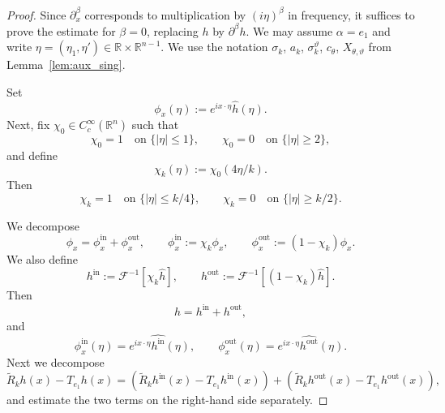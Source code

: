 \documentclass[12pt,a4paper]{amsart}
\numberwithin{equation}{section}
\theoremstyle{plain}
\theoremstyle{definition}
\begin{document}
\begin{proof}
Since $\partial_x^\beta$ corresponds to multiplication
by $(i\eta)^\beta$ in frequency, it suffices to prove the estimate
for $\beta=0$, replacing $h$ by $\partial^\beta h$.
We may assume $\alpha=e_1$ and write
$\eta=(\eta_1,\eta')\in\mathbb{R}\times\mathbb{R}^{n-1}$.
We use the notation $\sigma_k$, $a_k$, $\sigma_k^\vartheta$, $c_\theta$,
$X_{\theta,\vartheta}$ from Lemma~\ref{lem:aux_sing}.

Set
\begin{equation*}
    \phi_x(\eta):=e^{ix\cdot\eta}\widehat{h}(\eta).
\end{equation*}
Next, fix $\chi_0\in C_c^\infty(\mathbb{R}^n)$ such that
\begin{equation*}
    \chi_0=1 \quad \text{on } \{|\eta|\leq 1\},
\qquad
\chi_0=0 \quad \text{on } \{|\eta|\geq 2\},
\end{equation*}
and define
\begin{equation*}
    \chi_k(\eta):=\chi_0(4\eta/k).
\end{equation*}
Then
\begin{equation*}
    \chi_k=1 \quad \text{on } \{|\eta|\leq k/4\},
\qquad
\chi_k=0 \quad \text{on } \{|\eta|\geq k/2\}.
\end{equation*}

We decompose
\begin{equation*}
    \phi_x=\phi_x^{\mathrm{in}}+\phi_x^{\mathrm{out}},
\qquad
\phi_x^{\mathrm{in}}:=\chi_k\phi_x,
\qquad
\phi_x^{\mathrm{out}}:=(1-\chi_k)\phi_x.
\end{equation*}
We also define
\begin{equation*}
    h^{\mathrm{in}}:=\mathcal{F}^{-1}[\chi_k\widehat h],
\qquad
h^{\mathrm{out}}:=\mathcal{F}^{-1}[(1-\chi_k)\widehat h].
\end{equation*}
Then
\begin{equation*}
    h=h^{\mathrm{in}}+h^{\mathrm{out}},
\end{equation*}
and
\begin{equation*}
    \phi_x^{\mathrm{in}}(\eta)=e^{ix\cdot\eta}\widehat{h^{\mathrm{in}}}(\eta),
\qquad
\phi_x^{\mathrm{out}}(\eta)=e^{ix\cdot\eta}\widehat{h^{\mathrm{out}}}(\eta).
\end{equation*}
Next we decompose
\begin{equation*}
    \widetilde{R}_k h(x)-T_{e_1} h(x)
=
(\widetilde{R}_k h^{\mathrm{in}}(x)-T_{e_1} h^{\mathrm{in}}(x))
+
(\widetilde{R}_k h^{\mathrm{out}}(x)-T_{e_1} h^{\mathrm{out}}(x)),
\end{equation*}
and estimate the two terms on the right-hand side separately.


\end{proof}
\end{document}
